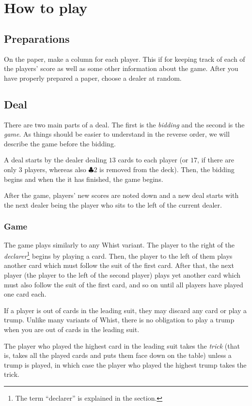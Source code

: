 \documentclass[a4paper]{article}
\begin{document}
	\section{How to play}{%
		\subsection{Preparations}{%
			On the paper, make a column for each player. This if for keeping track of each of the players' score as well as some other information about the game. After you have properly prepared a paper, choose a dealer at random.
		}

		\subsection{Deal}{%
			There are two main parts of a deal. The first is the \emph{bidding} and the second is the \emph{game}. As things should be easier to understand in the reverse order, we will describe the game before the bidding.

			A deal starts by the dealer dealing $13$ cards to each player (or $17$, if there are only $3$ players, whereas also $\clubsuit 2$ is removed from the deck). Then, the bidding begins and when the it has finished, the game begins.

			After the game, players' new scores are noted down and a new deal starts with the next dealer being the player who sits to the left of the current dealer.

			\subsubsection{Game}{%
				The game plays similarly to any Whist variant. The player to the right of the \emph{declarer}\footnote{The term ``declarer'' is explained in the \textit{} section.} begins by playing a card. Then, the player to the left of them plays another card which must follow the suit of the first card. After that, the next player (the player to the left of the second player) plays yet another card which must also follow the suit of the first card, and so on until all players have played one card each.

				If a player is out of cards in the leading suit, they may discard any card or play a trump. Unlike many variants of Whist, there is no obligation to play a trump when you are out of cards in the leading suit.

				The player who played the highest card in the leading suit takes the \emph{trick} (that is, takes all the played cards and puts them face down on the table) unless a trump is played, in which case the player who played the highest trump takes the trick.

}}}
\end{document}
